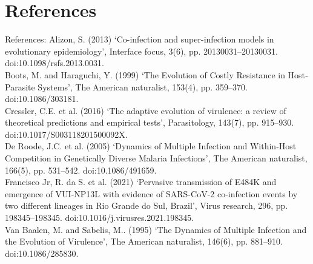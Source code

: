 \documentclass{beamer}
\begin{document}
	\section{References}
	\begin{frame}{References:}
		\scriptsize Alizon, S. (2013) ‘Co-infection and super-infection models in evolutionary epidemiology’, Interface focus, 3(6), pp. 20130031–20130031. doi:10.1098/rsfs.2013.0031.\\
		\vspace{1em}
		Boots, M. and Haraguchi, Y. (1999) ‘The Evolution of Costly Resistance in Host‐Parasite Systems’, The American naturalist, 153(4), pp. 359–370. doi:10.1086/303181.\\
		\vspace{1em}
		Cressler, C.E. et al. (2016) ‘The adaptive evolution of virulence: a review of theoretical predictions and empirical tests’, Parasitology, 143(7), pp. 915–930. doi:10.1017/S003118201500092X.\\
		\vspace{1em}
		De Roode, J.C. et al. (2005) ‘Dynamics of Multiple Infection and Within‐Host Competition in Genetically Diverse Malaria Infections’, The American naturalist, 166(5), pp. 531–542. doi:10.1086/491659.\\
		\vspace{1em}
		Francisco Jr, R. da S. et al. (2021) ‘Pervasive transmission of E484K and emergence of VUI-NP13L with evidence of SARS-CoV-2 co-infection events by two different lineages in Rio Grande do Sul, Brazil’, Virus research, 296, pp. 198345–198345. doi:10.1016/j.virusres.2021.198345.\\
		\vspace{1em}
		Van Baalen, M. and Sabelis, M.. (1995) ‘The Dynamics of Multiple Infection and the Evolution of Virulence’, The American naturalist, 146(6), pp. 881–910. doi:10.1086/285830.
	\end{frame}
\end{document}
